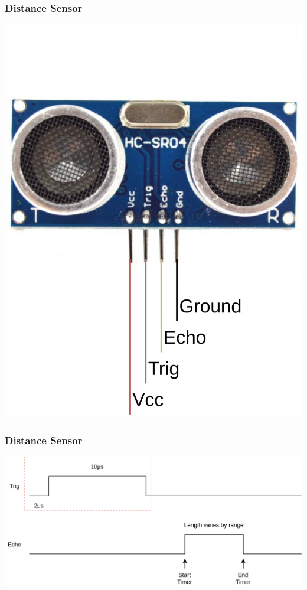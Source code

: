 \documentclass{beamer}
\begin{document}
    \begin{frame}
        \frametitle{Distance Sensor}
        \centering
        \includegraphics[scale=0.08]{img/hcsr04.png}
    \end{frame}

    \begin{frame}
        \frametitle{Distance Sensor}
        \includegraphics[width=\linewidth]{img/ultrasonic-sensor.png}
    \end{frame}
\end{document}
